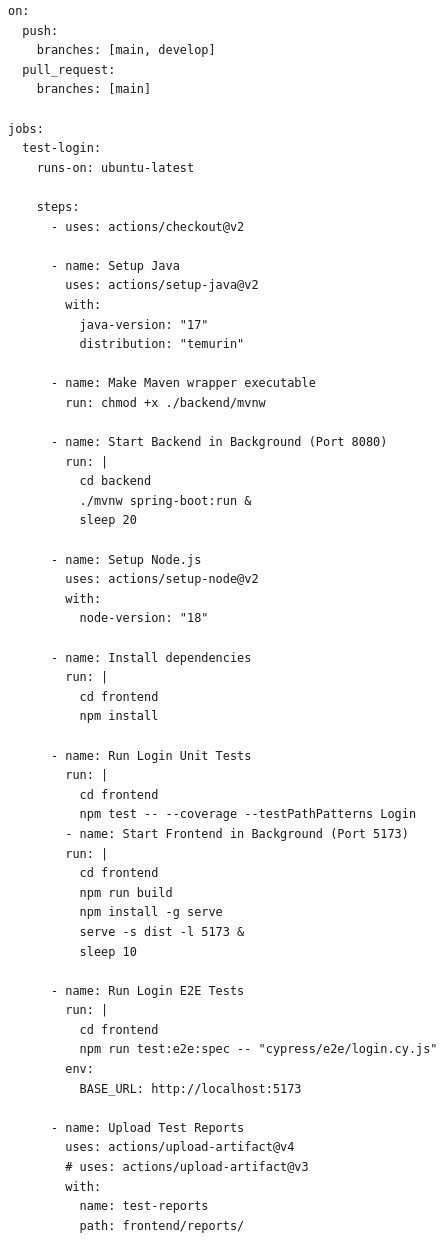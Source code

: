 \documentclass[a4paper,12pt]{article}
\begin{document}
{\begin{itemize}
\begin{tcolorbox}[breakable, colback=green!5,colframe=black!50,title=Tạo GitHub Actions Workflow ]
\begin{lstlisting}
on:
  push:
    branches: [main, develop]
  pull_request:
    branches: [main]

jobs:
  test-login:
    runs-on: ubuntu-latest

    steps:
      - uses: actions/checkout@v2

      - name: Setup Java
        uses: actions/setup-java@v2
        with:
          java-version: "17"
          distribution: "temurin"

      - name: Make Maven wrapper executable
        run: chmod +x ./backend/mvnw

      - name: Start Backend in Background (Port 8080)
        run: |
          cd backend
          ./mvnw spring-boot:run &
          sleep 20

      - name: Setup Node.js
        uses: actions/setup-node@v2
        with:
          node-version: "18"

      - name: Install dependencies
        run: |
          cd frontend
          npm install

      - name: Run Login Unit Tests
        run: |
          cd frontend
          npm test -- --coverage --testPathPatterns Login
        - name: Start Frontend in Background (Port 5173)
        run: |
          cd frontend
          npm run build
          npm install -g serve
          serve -s dist -l 5173 &
          sleep 10

      - name: Run Login E2E Tests
        run: |
          cd frontend
          npm run test:e2e:spec -- "cypress/e2e/login.cy.js"
        env:
          BASE_URL: http://localhost:5173

      - name: Upload Test Reports
        uses: actions/upload-artifact@v4
        # uses: actions/upload-artifact@v3
        with:
          name: test-reports
          path: frontend/reports/
\end{lstlisting}
\end{tcolorbox}



\end{itemize}}
\end{document}
